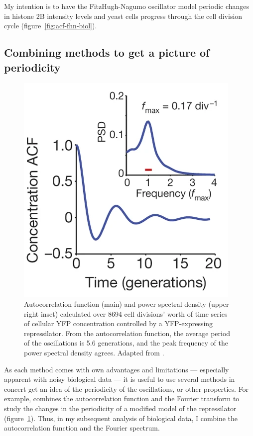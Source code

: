 My intention is to have the FitzHugh-Nagumo oscillator model periodic changes in histone 2B intensity levels and yeast cells progress through the cell division cycle (figure~\ref{fig:acf-fhn-biol}).


\subsection{Combining methods to get a picture of periodicity}
\label{subsec:analysis-characterisation-combined}

\begin{figure}
  \centering
  \includegraphics[width=0.5\linewidth]{potvin-trottierSynchronousLongtermOscillations2016_1e_adapted}
  \caption[
    Autocorrelation function and power spectral density calculated time series of cellular YFP concentration
  ]{
    Autocorrelation function (main) and power spectral density (upper-right inset) calculated over \num{8694} cell divisions' worth of time series of cellular YFP concentration controlled by a YFP-expressing repressilator.
    From the autocorrelation function, the average period of the oscillations is 5.6 generations, and the peak frequency of the power spectral density agrees.
    Adapted from \textcite{potvin-trottierSynchronousLongtermOscillations2016}.
  }
  \label{fig:acf-fft-example}
\end{figure}

As each method comes with own advantages and limitations --- especially apparent with noisy biological data --- it is useful to use several methods in concert get an idea of the periodicity of the oscillations, or other properties.
For example, \textcite{potvin-trottierSynchronousLongtermOscillations2016} combines the autocorrelation function and the Fourier transform to study the changes in the periodicity of a modified model of the repressilator (figure~\ref{fig:acf-fft-example}).
Thus, in my subsequent analysis of biological data, I combine the autocorrelation function and the Fourier spectrum.

